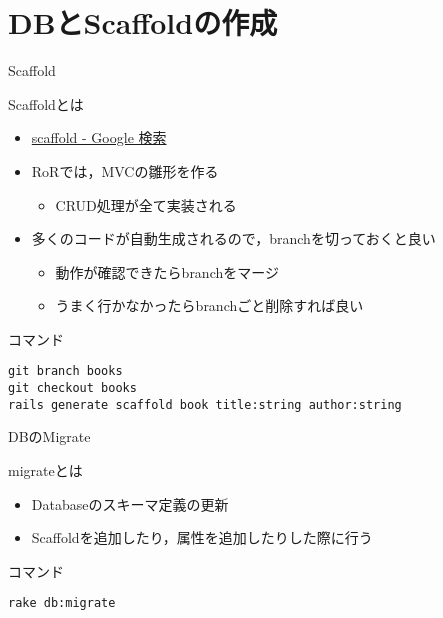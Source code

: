 \documentclass[t, aspectratio=169]{beamer}
\begin{document}
\section{DBとScaffoldの作成}
\label{sec-7-1}
\begin{frame}[fragile,label=sec-7-1-1]{Scaffold}
 \begin{block}{Scaffoldとは}
\begin{itemize}
\item \href{https://www.google.co.jp/search?q=scaffold&client=ubuntu&hs=PiK&channel=fs&hl=ja&source=lnms&tbm=isch&sa=X&ei=smUdVKaZKY7s8AXew4LwDw&ved=0CAgQ_AUoAQ&biw=1195&bih=925}{scaffold - Google 検索}
\item RoRでは，MVCの雛形を作る
\begin{itemize}
\item CRUD処理が全て実装される
\end{itemize}
\item 多くのコードが自動生成されるので，branchを切っておくと良い
\begin{itemize}
\item 動作が確認できたらbranchをマージ
\item うまく行かなかったらbranchごと削除すれば良い
\end{itemize}
\end{itemize}
\end{block}

\begin{block}{コマンド}
\begin{verbatim}
git branch books
git checkout books
rails generate scaffold book title:string author:string
\end{verbatim}
\end{block}
\end{frame}
\begin{frame}[fragile,label=sec-7-1-2]{DBのMigrate}
 \begin{block}{migrateとは}
\begin{itemize}
\item Databaseのスキーマ定義の更新
\item Scaffoldを追加したり，属性を追加したりした際に行う
\end{itemize}
\end{block}

\begin{block}{コマンド}
\begin{verbatim}
rake db:migrate
\end{verbatim}
\end{block}
\end{frame}
\end{document}
